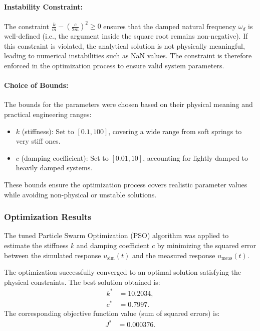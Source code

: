 \documentclass[12pt]{article}
\begin{document}
\paragraph{Instability Constraint:} 
The constraint \( \frac{k}{m} - \left(\frac{c}{2m}\right)^2 \geq 0 \) ensures that the damped natural frequency \( \omega_d \) is well-defined (i.e., the argument inside the square root remains non-negative). If this constraint is violated, the analytical solution is not physically meaningful, leading to numerical instabilities such as NaN values. The constraint is therefore enforced in the optimization process to ensure valid system parameters.


\paragraph{Choice of Bounds:} The bounds for the parameters were chosen based on their physical meaning and practical engineering ranges:
\begin{itemize}
    \item $k$ (stiffness): Set to $[0.1, 100]$, covering a wide range from soft springs to very stiff ones.
    \item $c$ (damping coefficient): Set to $[0.01, 10]$, accounting for lightly damped to heavily damped systems.
\end{itemize}
These bounds ensure the optimization process covers realistic parameter values while avoiding non-physical or unstable solutions.

\subsubsection{Optimization Results}

The tuned Particle Swarm Optimization (PSO) algorithm was applied to estimate the stiffness $k$ and damping coefficient $c$ by minimizing the squared error between the simulated response $u_{\text{sim}}(t)$ and the measured response $u_{\text{meas}}(t)$. 

The optimization successfully converged to an optimal solution satisfying the physical constraints. The best solution obtained is:
\begin{align*}
    k^* &= 10.2034, \\
    c^* &= 0.7997.
\end{align*}
The corresponding objective function value (sum of squared errors) is:
\begin{align*}
    J^* &= 0.000376.
\end{align*}
\end{document}
